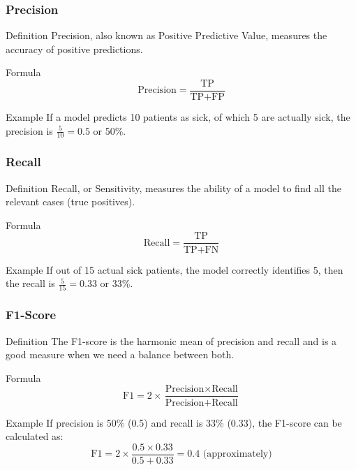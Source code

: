 \documentclass[aspectratio=169]{beamer}
\begin{document}
\begin{frame}[fragile]
    \frametitle{Precision}
    \begin{block}{Definition}
        Precision, also known as Positive Predictive Value, measures the accuracy of positive predictions.
    \end{block}
    \begin{block}{Formula}
        \begin{equation}
            \text{Precision} = \frac{\text{TP}}{\text{TP} + \text{FP}}
        \end{equation}
    \end{block}
    \begin{block}{Example}
        If a model predicts 10 patients as sick, of which 5 are actually sick, the precision is 
        \( \frac{5}{10} = 0.5 \) or 50\%.
    \end{block}
\end{frame}

\begin{frame}[fragile]
    \frametitle{Recall}
    \begin{block}{Definition}
        Recall, or Sensitivity, measures the ability of a model to find all the relevant cases (true positives).
    \end{block}
    \begin{block}{Formula}
        \begin{equation}
            \text{Recall} = \frac{\text{TP}}{\text{TP} + \text{FN}}
        \end{equation}
    \end{block}
    \begin{block}{Example}
        If out of 15 actual sick patients, the model correctly identifies 5, then the recall is 
        \( \frac{5}{15} = 0.33 \) or 33\%.
    \end{block}
\end{frame}

\begin{frame}[fragile]
    \frametitle{F1-Score}
    \begin{block}{Definition}
        The F1-score is the harmonic mean of precision and recall and is a good measure when we need a balance between both.
    \end{block}
    \begin{block}{Formula}
        \begin{equation}
            \text{F1} = 2 \times \frac{\text{Precision} \times \text{Recall}}{\text{Precision} + \text{Recall}}
        \end{equation}
    \end{block}
    \begin{block}{Example}
        If precision is 50\% (0.5) and recall is 33\% (0.33), the F1-score can be calculated as:
        \[
        \text{F1} = 2 \times \frac{0.5 \times 0.33}{0.5 + 0.33} = 0.4 \text{ (approximately)}
        \]
    \end{block}
\end{frame}
\end{document}
